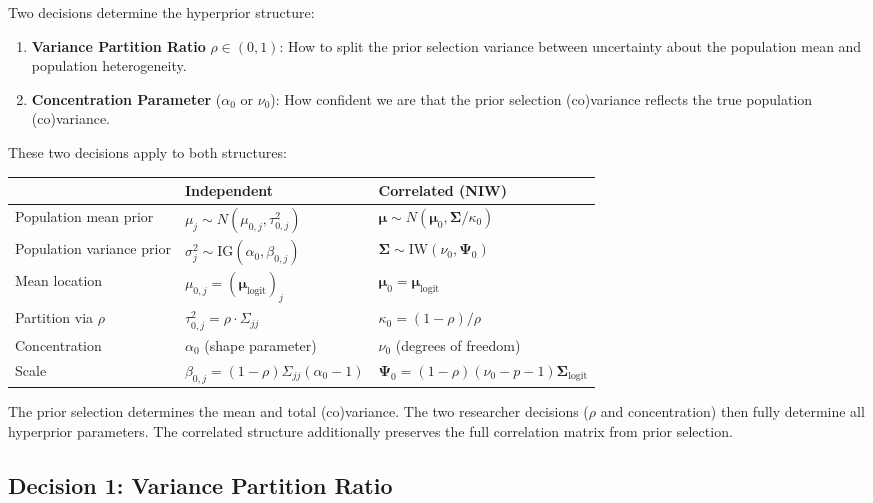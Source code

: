 \documentclass[11pt]{article}
\begin{document}
Two decisions determine the hyperprior structure:

\begin{enumerate}
  \item \textbf{Variance Partition Ratio} $\rho \in (0, 1)$: How to split the prior selection variance between uncertainty about the population mean and population heterogeneity.

  \item \textbf{Concentration Parameter} ($\alpha_0$ or $\nu_0$): How confident we are that the prior selection (co)variance reflects the true population (co)variance.
\end{enumerate}

These two decisions apply to both structures:

\begin{center}
\begin{tabular}{lll}
\toprule
& \textbf{Independent} & \textbf{Correlated (NIW)} \\
\midrule
Population mean prior & $\mu_j \sim N(\mu_{0,j}, \tau_{0,j}^2)$ & $\boldsymbol{\mu} \sim N(\boldsymbol{\mu}_0, \boldsymbol{\Sigma}/\kappa_0)$ \\
Population variance prior & $\sigma_j^2 \sim \text{IG}(\alpha_0, \beta_{0,j})$ & $\boldsymbol{\Sigma} \sim \text{IW}(\nu_0, \boldsymbol{\Psi}_0)$ \\
\midrule
Mean location & $\mu_{0,j} = (\boldsymbol{\mu}_{\text{logit}})_j$ & $\boldsymbol{\mu}_0 = \boldsymbol{\mu}_{\text{logit}}$ \\
Partition via $\rho$ & $\tau_{0,j}^2 = \rho \cdot \Sigma_{jj}$ & $\kappa_0 = (1-\rho)/\rho$ \\
Concentration & $\alpha_0$ (shape parameter) & $\nu_0$ (degrees of freedom) \\
Scale & $\beta_{0,j} = (1-\rho)\Sigma_{jj}(\alpha_0-1)$ & $\boldsymbol{\Psi}_0 = (1-\rho)(\nu_0-p-1)\boldsymbol{\Sigma}_{\text{logit}}$ \\
\bottomrule
\end{tabular}
\end{center}

The prior selection determines the mean and total (co)variance. The two researcher decisions ($\rho$ and concentration) then fully determine all hyperprior parameters. The correlated structure additionally preserves the full correlation matrix from prior selection.

\subsection{Decision 1: Variance Partition Ratio}
\end{document}
